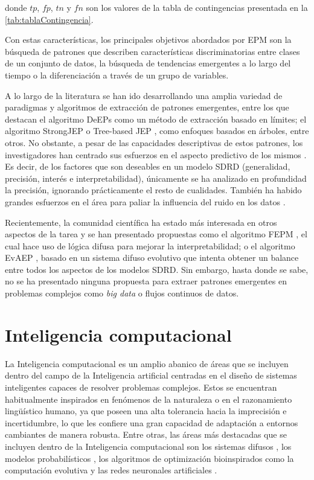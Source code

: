 \documentclass[c5paper,10pt,twoside]{book}	   	%
\begin{document}
\noindent donde $tp$, $fp$, $tn$ y $fn$ son los valores de la tabla de contingencias presentada en la \cref{tab:tablaContingencia}. 


Con estas características, los principales objetivos abordados por \ac{EPM} son la búsqueda de patrones que describen características discriminatorias entre clases de un conjunto de datos, la búsqueda de tendencias emergentes a lo largo del tiempo o la diferenciación a través de un grupo de variables. 

A lo largo de la literatura se han ido desarrollando una amplia variedad de paradigmas y algoritmos de extracción de patrones emergentes, entre los que destacan el algoritmo DeEPs \cite{Ldrw04} como un método de extracción basado en límites; el algoritmo StrongJEP \cite{Fr06} o Tree-based JEP \cite{Bmr02}, como enfoques basados en árboles, entre otros. No obstante, a pesar de las capacidades descriptivas de estos patrones, los investigadores han centrado sus esfuerzos en el aspecto predictivo de los mismos \cite{Gmc14}. Es decir, de los factores que son deseables en un modelo \ac{SDRD} (generalidad, precisión, interés e interpretabilidad), únicamente se ha analizado en profundidad la precisión, ignorando prácticamente el resto de cualidades. También ha habido grandes esfuerzos en el área para paliar la influencia del ruido en los datos \cite{Bmr03,Fr04,Fr06,Rf07}. 

Recientemente, la comunidad científica ha estado más interesada en otros aspectos de la tarea y se han presentado propuestas como el algoritmo FEPM \cite{Gmc11}, el cual hace uso de lógica difusa para mejorar la interpretabilidad; o el algoritmo EvAEP \cite{Gmacd16}, basado en un sistema difuso evolutivo que intenta obtener un balance entre todos los aspectos de los modelos \ac{SDRD}. Sin embargo, hasta donde se sabe, no se ha presentado ninguna propuesta para extraer patrones emergentes en problemas complejos como \emph{big data} o flujos continuos de datos.



\section{Inteligencia computacional} \label{sec:flexible}

La Inteligencia computacional \cite{Konar05} es un amplio abanico de áreas que se incluyen dentro del campo de la Inteligencia artificial centradas en el diseño de sistemas inteligentes capaces de resolver problemas complejos. Estos se encuentran habitualmente inspirados en fenómenos de la naturaleza o en el razonamiento lingüístico humano, ya que poseen una alta tolerancia hacia la imprecisión e incertidumbre, lo que les confiere una gran capacidad de adaptación a entornos cambiantes de manera robusta. Entre otras, las áreas más destacadas que se incluyen dentro de la Inteligencia computacional son los sistemas difusos \cite{Zad65,Zad75}, los modelos probabilísticos \cite{As00}, los algoritmos de optimización bioinspirados como la computación evolutiva \cite{Bfm97} y las redes neuronales artificiales \cite{Gol96}.
\end{document}
